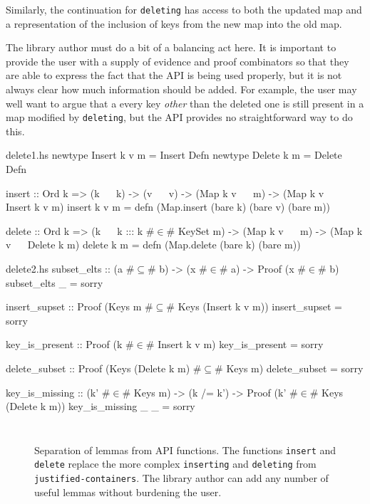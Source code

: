 \documentclass[format=sigplan, review=false, screen=true]{acmart}
\begin{document}
Similarly, the continuation for \texttt{deleting} has access to both the updated map
and a representation of the inclusion of keys from the new map into the old map.

The library author must do a bit of a balancing act here. It is important to provide
the user with a supply of evidence and proof combinators so that they are able to
express the fact that the API is being used properly, but it is not always clear how
much information should be added. For example, the user may well want to argue that a
every key \emph{other} than the deleted one is still present in a map modified by
\texttt{deleting}, but the API provides no straightforward way to do this.

\begin{filecontents*}{delete1.hs}
newtype Insert k v m = Insert Defn
newtype Delete k m   = Delete Defn

insert :: Ord k
       => (k ~~ k)
       -> (v ~~ v)
       -> (Map k v ~~ m)
       -> (Map k v ~~ Insert k v m)
insert k v m =
    defn (Map.insert (bare k) (bare v) (bare m))
       
delete :: Ord k
       => (k ~~ k ::: k #$\in$# KeySet m)
       -> (Map k v ~~ m)
       -> (Map k v ~~ Delete k m)
delete k m = defn (Map.delete (bare k) (bare m))
\end{filecontents*}
\begin{filecontents*}{delete2.hs}
subset_elts :: (a #$\subseteq$# b) -> (x #$\in$# a)
            -> Proof (x #$\in$# b)
subset_elts _ = sorry

insert_supset :: Proof (Keys m #$\subseteq$# Keys (Insert k v m))
insert_supset = sorry

key_is_present :: Proof (k #$\in$# Insert k v m)
key_is_present = sorry

delete_subset :: Proof (Keys (Delete k m) #$\subseteq$# Keys m)
delete_subset = sorry

key_is_missing  :: (k' #$\in$# Keys m) -> (k /= k')
                -> Proof (k' #$\in$# Keys (Delete k m))
key_is_missing _ _ = sorry                
\end{filecontents*}

\begin{figure*}
  \begin{minipage}{0.49\textwidth}
    \inputminted{haskell}{delete1.hs}
  \end{minipage}
  \begin{minipage}{0.49\textwidth}
    \inputminted{haskell}{delete2.hs}
  \end{minipage}
  \caption{Separation of lemmas from API functions. The functions
    \texttt{insert} and \texttt{delete} replace the more complex
    \texttt{inserting} and \texttt{deleting} from \texttt{justified-containers}.
    The library author can add any number of useful lemmas without burdening the
    user.}
\end{figure*}
\end{document}
